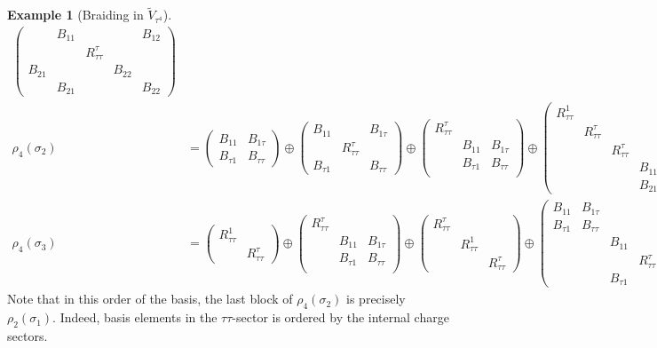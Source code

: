\documentclass[a4paper,10pt,oneside]{book}
\theoremstyle{plain}
\theoremstyle{definition}
\newtheorem{example}{Example}[section]
\theoremstyle{remark}
\begin{document}
\begin{example}[Braiding in $\widetilde{V}_{τ^4}$]
{\begin{align*}
\begin{pmatrix}
             & B_{11}            &                   &        & B_{12} \\
             &                   & R_{ττ}^τ \\
      B_{21} &                   &                   & B_{22} & \\
             & B_{21}            &                   &        & B_{22}
    \end{pmatrix} \\
    ρ_4(σ_2) &=
    \begin{pmatrix}
      B_{11} & B_{1τ} \\
      B_{τ1} & B_{ττ}
    \end{pmatrix}
    \oplus
    \begin{pmatrix}
      B_{11} & & B_{1τ} \\
      & R_{ττ}^τ \\
      B_{τ1} & & B_{ττ}
    \end{pmatrix}
    \oplus
    \begin{pmatrix}
      R_{ττ}^τ \\
      & B_{11} & B_{1τ} \\
      & B_{τ1} & B_{ττ} \\
    \end{pmatrix}
    \oplus
    \begin{pmatrix}
      R_{ττ}^1 \\
      & R_{ττ}^τ \\
      & & R_{ττ}^τ \\
      & & & B_{11} & B_{12} \\
      & & & B_{21} & B_{22}
    \end{pmatrix} \\
    ρ_4(σ_3) &=
    \begin{pmatrix}
      R_{ττ}^1 \\
      & R_{ττ}^τ
    \end{pmatrix}
    \oplus
    \begin{pmatrix}
      R_{ττ}^τ \\
      & B_{11} & B_{1τ} \\
      & B_{τ1} & B_{ττ} \\
    \end{pmatrix}
    \oplus
    \begin{pmatrix}
      R_{ττ}^τ \\
      & R_{ττ}^1 \\
      & & R_{ττ}^τ
    \end{pmatrix}
    \oplus
    \begin{pmatrix}
      B_{11} & B_{1τ} \\
      B_{τ1} & B_{ττ} \\
      & & B_{11} & & B_{1τ} \\
      & & & R_{ττ}^τ \\
      & & B_{τ1} & & B_{ττ}
    \end{pmatrix}
  \end{align*}}
  Note that in this order of the basis, the last block of $ρ_{4}(σ_2)$ is precisely $ρ_2(σ_1)$. Indeed, basis elements in the $ττ$-sector is ordered by the internal charge sectors.
\end{example}
\end{document}
